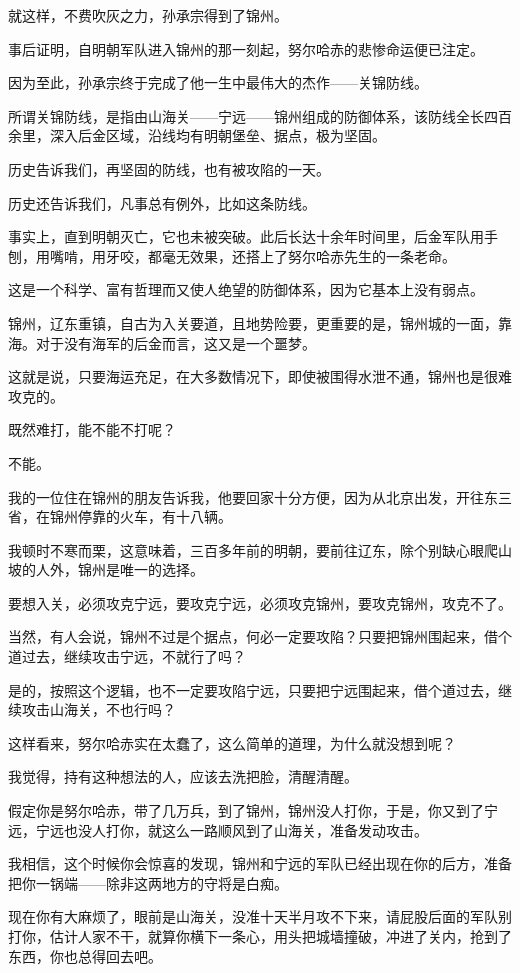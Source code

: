 \begin{multicols}{\theparacolNo}
		就这样，不费吹灰之力，孙承宗得到了锦州。

		事后证明，自明朝军队进入锦州的那一刻起，努尔哈赤的悲惨命运便已注定。

		因为至此，孙承宗终于完成了他一生中最伟大的杰作——关锦防线。

		所谓关锦防线，是指由山海关——宁远——锦州组成的防御体系，该防线全长四百余里，深入后金区域，沿线均有明朝堡垒、据点，极为坚固。

		历史告诉我们，再坚固的防线，也有被攻陷的一天。

		历史还告诉我们，凡事总有例外，比如这条防线。

		事实上，直到明朝灭亡，它也未被突破。此后长达十余年时间里，后金军队用手刨，用嘴啃，用牙咬，都毫无效果，还搭上了努尔哈赤先生的一条老命。

		这是一个科学、富有哲理而又使人绝望的防御体系，因为它基本上没有弱点。

		锦州，辽东重镇，自古为入关要道，且地势险要，更重要的是，锦州城的一面，靠海。对于没有海军的后金而言，这又是一个噩梦。

		这就是说，只要海运充足，在大多数情况下，即使被围得水泄不通，锦州也是很难攻克的。

		既然难打，能不能不打呢？

		不能。

		我的一位住在锦州的朋友告诉我，他要回家十分方便，因为从北京出发，开往东三省，在锦州停靠的火车，有十八辆。

		我顿时不寒而栗，这意味着，三百多年前的明朝，要前往辽东，除个别缺心眼爬山坡的人外，锦州是唯一的选择。

		要想入关，必须攻克宁远，要攻克宁远，必须攻克锦州，要攻克锦州，攻克不了。

		当然，有人会说，锦州不过是个据点，何必一定要攻陷？只要把锦州围起来，借个道过去，继续攻击宁远，不就行了吗？

		是的，按照这个逻辑，也不一定要攻陷宁远，只要把宁远围起来，借个道过去，继续攻击山海关，不也行吗？

		这样看来，努尔哈赤实在太蠢了，这么简单的道理，为什么就没想到呢？

		我觉得，持有这种想法的人，应该去洗把脸，清醒清醒。

		假定你是努尔哈赤，带了几万兵，到了锦州，锦州没人打你，于是，你又到了宁远，宁远也没人打你，就这么一路顺风到了山海关，准备发动攻击。

		我相信，这个时候你会惊喜的发现，锦州和宁远的军队已经出现在你的后方，准备把你一锅端——除非这两地方的守将是白痴。

		现在你有大麻烦了，眼前是山海关，没准十天半月攻不下来，请屁股后面的军队别打你，估计人家不干，就算你横下一条心，用头把城墙撞破，冲进了关内，抢到了东西，你也总得回去吧。


\end{multicols}
